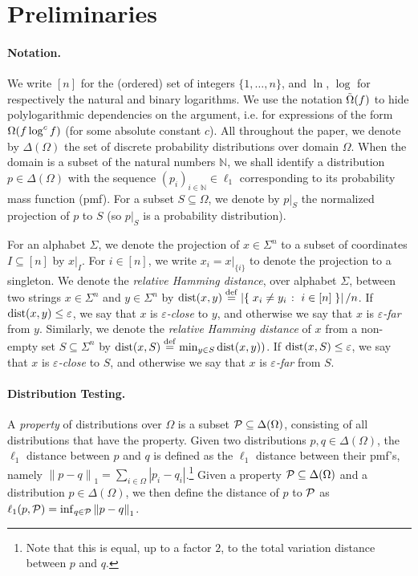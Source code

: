 \documentclass[11pt]{article}
\theoremstyle{remark}   	\newtheorem{remark}[theorem]{Remark}
\theoremstyle{definition}   	\newaliascnt{defn}{theorem}
\newcommand{\eps}{\ensuremath{\varepsilon}\xspace}
\newcommand{\domain}[1][{[n]}]{\ensuremath{#1}\xspace} \newcommand{\distribs}[1]{\Delta\!\left(#1\right)} \newcommand{\yes}{{\sf{}yes}\xspace}
\newcommand{\bigOmega}[1]{{\Omega\mleft( #1 \mright)}}
\newcommand{\tildeOmega}[1]{\operatorname{\tilde{\Omega}}\mleft( #1 \mright)}
\newcommand{\setOfSuchThat}[2]{ \left\{\; #1 \;\colon\; #2\; \right\} } 			\newcommand{\indicSet}[1]{\mathds{1}_{#1}}                                              \newcommand{\indic}[1]{\indicSet{\left\{#1\right\}}}                                             \newcommand{\disjunion}{\amalg}
\newcommand{\distop}{\operatorname{dist}}
\newcommand{\dist}[2]{\distop\mleft({#1, #2}\mright)}
\newcommand{\norm}[1]{\lVert#1{\rVert}}
\newcommand{\normone}[1]{{\norm{#1}}_1}
\newcommand{\abs}[1]{\left\lvert #1 \right\rvert}
\newcommand{\N}{\ensuremath{\mathbb{N}}\xspace}
\newcommand{\lp}[1][1]{\ell_{#1}}
\begin{document}
\section{Preliminaries}\label{sec:prelim}
\paragraph{Notation.} We write $[n]$ for the (ordered) set of integers $\{1,\dots,n\}$, and $\ln$, $\log$ for respectively the natural and binary logarithms. We use the notation $\tildeOmega{f}$ to hide polylogarithmic dependencies on the argument, i.e. for expressions of the form $\bigOmega{f \log^c f}$ (for some absolute constant $c$). All throughout the paper, we denote by $\distribs{\domain[\Omega]}$ the set of discrete probability distributions over domain $\domain[\Omega]$. When the domain is a subset of the natural numbers $\N$, we shall identify a distribution $p\in\distribs{\domain[\Omega]}$ with the sequence $(p_i)_{i\in\N}\in\lp[1]$ corresponding to its probability mass function (pmf). For a subset $S \subseteq \Omega$, we denote by $p|_S$ the normalized projection of $p$ to $S$ (so $p|_S$ is a probability distribution).

For an alphabet $\Sigma$, we denote the projection of $x \in \Sigma^n$ to a subset of
  coordinates $I \subseteq [n]$ by $x|_I$. For $i \in [n]$, we write
  $x_i = x|_{\{i\}}$ to denote the projection to a singleton. We denote the \emph{relative Hamming distance}, over alphabet
  $\Sigma$, between two strings $x \in \Sigma^n$ and $y \in \Sigma^n$ by
  $\dist{x}{y} \eqdef \abs{ \setOfSuchThat{ x_i \neq y_i }{ i \in [n] } }/n$.
  If $\dist{x}{y} \leq \eps$, we say that $x$ is \emph{$\eps$-close}
  to $y$, and otherwise we say that $x$ is \emph{$\eps$-far} from
  $y$. Similarly, we denote the \emph{relative Hamming distance} of $x$ from
  a non-empty set $S \subseteq \Sigma^n$ by
  $\dist{x}{S} \eqdef \min_{y \in S} \dist{x}{y})$. If
  $\dist{x}{S} \leq \eps$, we say that $x$ is \emph{$\eps$-close} to
  $S$, and otherwise we say that $x$ is \emph{$\eps$-far} from $S$.
  
\paragraph{Distribution Testing.} A \emph{property} of distributions over $\domain[\Omega]$ is a subset $\property\subseteq \distribs{\domain[\Omega]}$, consisting of all distributions that have the property. Given two distributions $p,q\in\distribs{\domain[\Omega]}$, the $\lp[1]$ distance between $p$ and $q$ is defined as the $\lp[1]$ distance between their pmf's, namely $\normone{p-q} = \sum_{i\in\domain[\Omega]} \abs{p_i-q_i}$.\footnote{Note that this is equal, up to a factor $2$, to the total variation distance between $p$ and $q$.}{} Given a property $\property\subseteq \distribs{\domain[\Omega]}$ and a distribution $p\in\distribs{\domain[\Omega]}$, we then define the distance of $p$ to $\mathcal{P}$ as $\lp[1](p,\property) = \inf_{q\in\property} \normone{p-q}$.
\end{document}
